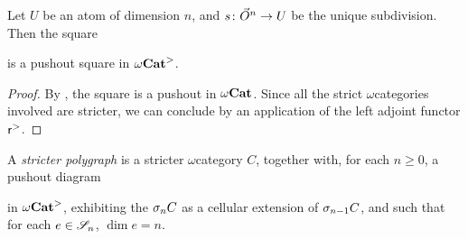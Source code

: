 \begin{lem} \label{lem:pushout_principal_cell}
    Let \( U \) be an atom of dimension \( n \), and \( s \colon \vec{O}^{n} \to U \) be the unique subdivision.
    Then the square
    \begin{center}
    \end{center}
    is a pushout square in \( {\omega\mathbf{Cat}}^> \).
\end{lem}
\begin{proof}
    By \cite[Lemma 9.1.12]{hadzihasanovic2024combinatorics}, the square is a pushout in \( {\omega\mathbf{Cat}} \).
    Since all the strict \( \omega \)\nbd categories involved are stricter, we can conclude by an application of the left adjoint functor \( \mathsf{r}^{>} \). 
\end{proof}

\begin{dfn} 
    A \emph{stricter polygraph} is a stricter \( \omega \)\nbd category \( C \), together with, for each \( n \geq 0 \), a pushout diagram
    \begin{center}
    \end{center}
    in \( {\omega\mathbf{Cat}}^> \), exhibiting the \( \sigma_{n}C \) as a cellular extension of \( \sigma_{n - 1}C \), and such that for each \( e \in \mathscr{S}_n \), \( \dim e = n \).
\end{dfn}

